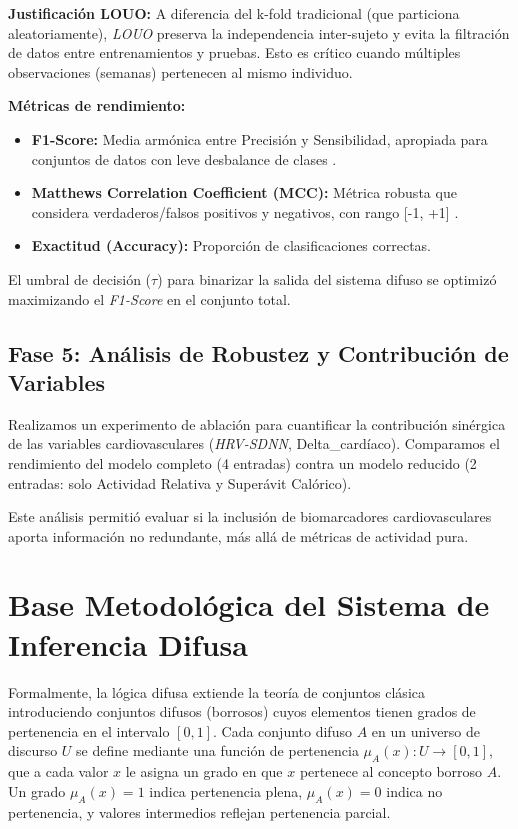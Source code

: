 \textbf{Justificación LOUO:} A diferencia del k-fold tradicional (que particiona aleatoriamente), \textit{LOUO} preserva la independencia inter-sujeto y evita la filtración de datos entre entrenamientos y pruebas. Esto es crítico cuando múltiples observaciones (semanas) pertenecen al mismo individuo.

\textbf{Métricas de rendimiento:}
\begin{itemize}
    \item \textbf{F1-Score:} Media armónica entre Precisión y Sensibilidad, apropiada para conjuntos de datos con leve desbalance de clases \cite{Sokolova2009}.
    \item \textbf{Matthews Correlation Coefficient (MCC):} Métrica robusta que considera verdaderos/falsos positivos y negativos, con rango [-1, +1] \cite{Chicco2020}.
    \item \textbf{Exactitud (Accuracy):} Proporción de clasificaciones correctas.
\end{itemize}

El umbral de decisión ($\tau$) para binarizar la salida del sistema difuso se optimizó maximizando el \textit{F1-Score} en el conjunto total.

\subsection{Fase 5: Análisis de Robustez y Contribución de Variables}
\label{subsec:fase5_robustez}

Realizamos un experimento de ablación para cuantificar la contribución sinérgica de las variables cardiovasculares (\textit{HRV-SDNN}, Delta\_cardíaco). Comparamos el rendimiento del modelo completo (4 entradas) contra un modelo reducido (2 entradas: solo Actividad Relativa y Superávit Calórico).

Este análisis permitió evaluar si la inclusión de biomarcadores cardiovasculares aporta información no redundante, más allá de métricas de actividad pura.

\section{Base Metodológica del Sistema de Inferencia Difusa}
\label{sec:base_metodologica_sistema_difuso}

Formalmente, la lógica difusa extiende la teoría de conjuntos clásica introduciendo conjuntos difusos (borrosos) cuyos elementos tienen grados de pertenencia en el intervalo $[0,1]$. Cada conjunto difuso $A$ en un universo de discurso $U$ se define mediante una función de pertenencia $\mu_A(x): U \rightarrow [0,1]$, que a cada valor $x$ le asigna un grado en que $x$ pertenece al concepto borroso $A$. Un grado $\mu_A(x) = 1$ indica pertenencia plena, $\mu_A(x) = 0$ indica no pertenencia, y valores intermedios reflejan pertenencia parcial.

